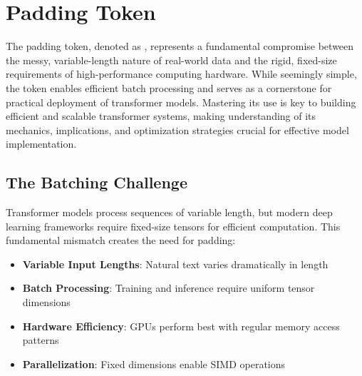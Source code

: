 \section{Padding Token \pad{}}

The padding token, denoted as \pad{}, represents a fundamental compromise between the messy, variable-length nature of real-world data and the rigid, fixed-size requirements of high-performance computing hardware. While seemingly simple, the \pad{} token enables efficient batch processing and serves as a cornerstone for practical deployment of transformer models. Mastering its use is key to building efficient and scalable transformer systems, making understanding of its mechanics, implications, and optimization strategies crucial for effective model implementation.

\subsection{The Batching Challenge}

Transformer models process sequences of variable length, but modern deep learning frameworks require fixed-size tensors for efficient computation. This fundamental mismatch creates the need for padding:

\begin{itemize}
\item \textbf{Variable Input Lengths}: Natural text varies dramatically in length
\item \textbf{Batch Processing}: Training and inference require uniform tensor dimensions
\item \textbf{Hardware Efficiency}: GPUs perform best with regular memory access patterns
\item \textbf{Parallelization}: Fixed dimensions enable SIMD operations
\end{itemize}

